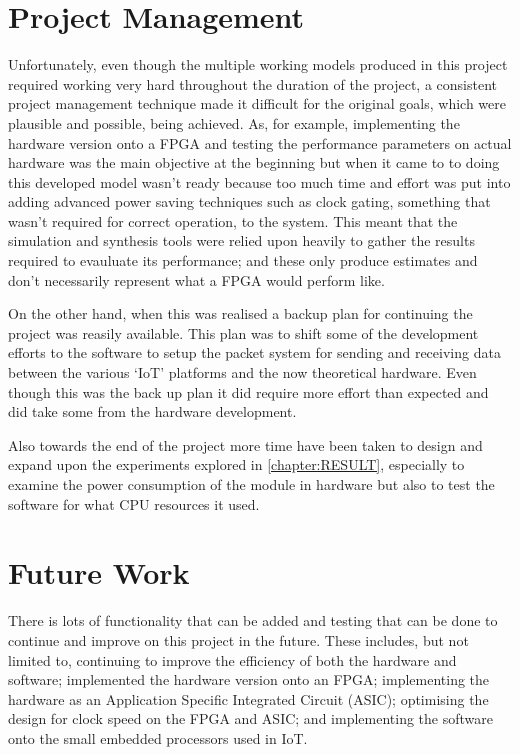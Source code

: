 \documentclass[12pt,twoside,a4paper]{report}
\begin{document}
	\section{Project Management}
	\label{section:proj_man}
	Unfortunately, even though the multiple working models produced in this project required working very hard throughout the duration of the project, a consistent project management technique made it difficult for the original goals, which were plausible and possible, being achieved. As, for example, implementing the hardware version onto a FPGA and testing the performance parameters on actual hardware was the main objective at the beginning but when it came to to doing this developed model wasn't ready because too much time and effort was put into adding advanced power saving techniques such as clock gating, something that wasn't required for correct operation, to the system. This meant that the simulation and synthesis tools were relied upon heavily to gather the results required to evauluate its performance; and these only produce estimates and don't necessarily represent what a FPGA would perform like.
	
	On the other hand, when this was realised a backup plan for continuing the project was reasily available. This plan was to shift some of the development efforts to the software to setup the packet system for sending and receiving data between the various `IoT' platforms and the now theoretical hardware. Even though this was the back up plan it did require more effort than expected and did take some from the hardware development.
	
	Also towards the end of the project more time have been taken to design and expand upon the experiments explored in \autoref{chapter:RESULT}, especially to examine the power consumption of the module in hardware but also to test the software for what CPU resources it used.
		
	\section{Future Work}
	There is lots of functionality that can be added and testing that can be done to continue and improve on this project in the future. These includes, but not limited to, continuing to improve the efficiency of both the hardware and software; implemented the hardware version onto an FPGA; implementing the hardware as an Application Specific Integrated Circuit (ASIC); optimising the design for clock speed on the FPGA and ASIC; and implementing the software onto the small embedded processors used in IoT.
	
\end{document}
